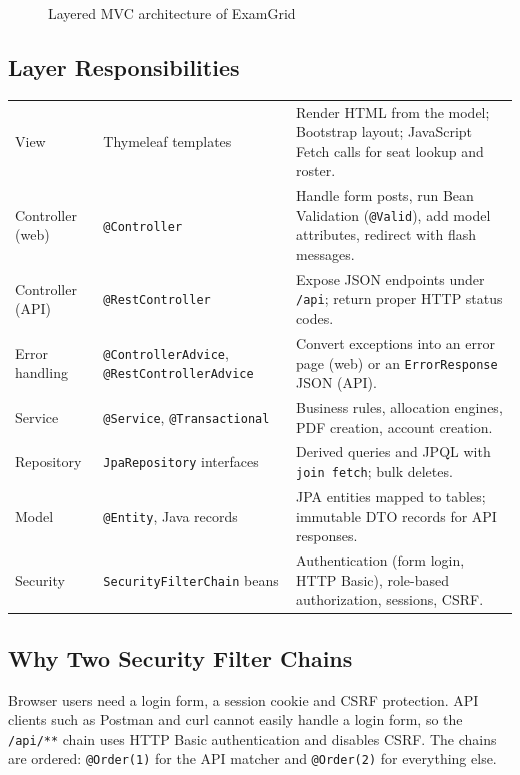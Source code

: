\documentclass[11pt,a4paper]{article}
\begin{document}
\begin{figure}[H]\centering
\resizebox{0.85\linewidth}{!}{}
\caption{Layered MVC architecture of ExamGrid}\label{fig:arch}
\end{figure}

\subsection{Layer Responsibilities}
\begin{tabularx}{\linewidth}{|l|L{3.3cm}|X|}
\hline\headrow{} &  & \\\hline
View & Thymeleaf templates & Render HTML from the model; Bootstrap layout; JavaScript Fetch calls for seat lookup and roster.\\\hline
Controller (web) & \texttt{@Controller} & Handle form posts, run Bean Validation (\texttt{@Valid}), add model attributes, redirect with flash messages.\\\hline
Controller (API) & \texttt{@RestController} & Expose JSON endpoints under \texttt{/api}; return proper HTTP status codes.\\\hline
Error handling & \texttt{@ControllerAdvice}, \texttt{@RestControllerAdvice} & Convert exceptions into an error page (web) or an \texttt{ErrorResponse} JSON (API).\\\hline
Service & \texttt{@Service}, \texttt{@Transactional} & Business rules, allocation engines, PDF creation, account creation.\\\hline
Repository & \texttt{JpaRepository} interfaces & Derived queries and JPQL with \texttt{join fetch}; bulk deletes.\\\hline
Model & \texttt{@Entity}, Java records & JPA entities mapped to tables; immutable DTO records for API responses.\\\hline
Security & \texttt{SecurityFilterChain} beans & Authentication (form login, HTTP Basic), role-based authorization, sessions, CSRF.\\\hline
\end{tabularx}

\subsection{Why Two Security Filter Chains}
Browser users need a login form, a session cookie and CSRF protection. API clients such as Postman and curl cannot easily handle a login form, so the \texttt{/api/**} chain uses HTTP Basic authentication and disables CSRF. The chains are ordered: \texttt{@Order(1)} for the API matcher and \texttt{@Order(2)} for everything else.
\end{document}
